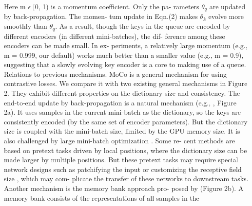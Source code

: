 \documentclass[10pt,twocolumn]{article}  %
\begin{document}
Here m $\epsilon$ [0, 1) is a momentum coefficient. Only the pa-
rameters $\theta_q$ are updated by back-propagation. The momen-
tum update in Eqn.(2) makes $\theta_k$ evolve more smoothly than
$\theta_q$. As a result, though the keys in the queue are encoded
by different encoders (in different mini-batches), the dif-
ference among these encoders can be made small. In ex-
periments, a relatively large momentum (e.g., m = 0.999,
our default) works much better than a smaller value (e.g.,
m = 0.9), suggesting that a slowly evolving key encoder is
a core to making use of a queue.
Relations to previous mechanisms. MoCo is a general
mechanism for using contrastive losses. We compare it with
two existing general mechanisms in Figure 2. They exhibit
different properties on the dictionary size and consistency.
The end-to-end update by back-propagation is a natural
mechanism (e.g., \cite{29_hadsell2006dimensionality, 46_oord2018representation, 36_hjelm2019learning, 63_ye2019unsupervised, 2_bachman2019learning, 35_henaff2019data}, Figure 2a). It uses
samples in the current mini-batch as the dictionary, so the
keys are consistently encoded (by the same set of encoder
parameters). But the dictionary size is coupled with the
mini-batch size, limited by the GPU memory size. It is also
challenged by large mini-batch optimization \cite{25_goyal2017accurate}. Some re-
cent methods \cite{46_oord2018representation, 36_hjelm2019learning, 2_bachman2019learning} are based on pretext tasks driven by
local positions, where the dictionary size can be made larger
by multiple positions. But these pretext tasks may require
special network designs such as patchifying the input \cite{46_oord2018representation}
or customizing the receptive field size \cite{2_bachman2019learning}, which may com-
plicate the transfer of these networks to downstream tasks.
Another mechanism is the memory bank approach pro-
posed by \cite{61_wu2018unsupervised} (Figure 2b). A memory bank consists of the
representations of all samples in the
\end{document}
